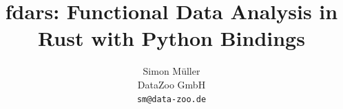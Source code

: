 \documentclass[11pt,a4paper]{article}
\title{fdars: Functional Data Analysis in Rust with Python Bindings}
\author{Simon M\"{u}ller\\
  DataZoo GmbH\\
  \texttt{sm@data-zoo.de}}
\date{}
\renewcommand{\_}{\textunderscore\allowbreak}
\begin{document}
\maketitle

\begin{abstract}

\end{abstract}















\end{document}
